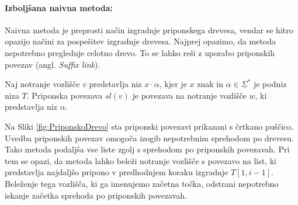 \paragraph{Izboljšana naivna metoda:}
Naivna metoda je preprosti način izgradnje priponskega drevesa, vendar se hitro opazijo načini za pospešitev izgradnje drevesa. Najprej opazimo, da metoda nepotrebno pregleduje celotno drevo. To se lahko reši z uporabo priponskih povezav (angl. \textit{Suffix link}).

\begin{defi}\label{def:sl}
    Naj notranje vozlišče $v$ predstavlja niz $x\cdot\alpha$, kjer je $x$ znak in $\alpha\in\Sigma^*$ je podniz niza $T$. Priponska povezava $\textit{sl}(v)$ je povezava na notranje vozlišče $w$, ki predstavlja niz $\alpha$.

\end{defi}

Na Sliki \ref{fig:PriponskoDrevo} sta priponski povezavi prikazani s črtkano puščico. Uvedba priponskih povezav omogoča izogib nepotrebnim sprehodom po drevesu. Tako metoda podaljša vse liste zgolj s sprehodom po priponskih povezavah. Pri tem se opazi, da metoda lahko beleži notranje vozlišče s povezavo na list, ki predstavlja najdaljšo pripono v predhodnjem koraku izgradnje $T[1,i-1]$. Beleženje tega vozlišča, ki ga imenujemo začetna točka, odstrani nepotrebno iskanje začetka sprehoda po priponskih povezavah.

